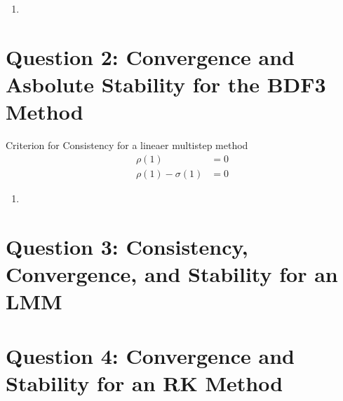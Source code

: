 \documentclass{article}
\begin{document}
\begin{enumerate}[label=\alph*)]
\begin{proof}
      \begin{align}
        \pi(z) = p(z) - \dt\lambda_i\sigma(z) = 0\\
        p(z) = \sum_{j=0}^{q} \alpha_j z^j, \quad 
        \sigma(z) = \sum_{j=0}^{q} \beta_j z^j
      \end{align}   
      We solve $(9)$ twice in order, once for each eigenvalue of our original
      linear transformation, $A$. The exact polynomial becomes,
      \begin{align}
        z^3 - z^2 -\frac{dt\lambda}{12}\left(\frac{5}{12} - \frac{16}{12}z +
        \frac{23}{12}z^2\right) &= 0\\
        z^3 - z^2\left(1 + \frac{23\dt\lambda}{12}\right) +
        \frac{16\dt\lambda}{12}z - \frac{5\dt\lambda}{12} &= 0
        \end{align}
        \begin{align}
        \begin{split}
         z^3 - z^2\left(1 + \frac{23\dt(-0.9667)}{12}\right) +
        \frac{16\dt(-0.9667)}{12}z - \frac{5\dt(-0.9667)}{12} &= 0\\
          z^3 - z^2\left(1 + \frac{23\dt(-99.0667)}{12}\right) +
        \frac{16\dt(-99.0667)}{12}z - \frac{5\dt(-99.0667)}{12} &= 0
        \end{split}
      \end{align}
    \end{proof}
  \item 

\end{enumerate}


\section*{Question 2: Convergence and Asbolute Stability for the BDF3 Method}

Criterion for Consistency for a lineaer multistep method
\begin{align}
\rho(1) &=0 \\
\rho(1) - \sigma(1) &=0
\end{align}

\begin{enumerate}[label=\alph*)]

  \item       

\end{enumerate}
\section*{Question 3: Consistency, Convergence, and Stability for an LMM}

\section*{Question 4: Convergence and Stability for an RK Method}
\end{document}
